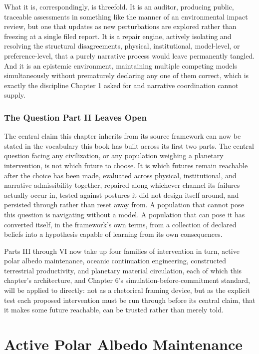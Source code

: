 \documentclass[11pt,oneside]{book}
\begin{document}
What it is, correspondingly, is threefold. It is an auditor, producing public, traceable assessments in something like the manner of an environmental impact review, but one that updates as new perturbations are explored rather than freezing at a single filed report. It is a repair engine, actively isolating and resolving the structural disagreements, physical, institutional, model-level, or preference-level, that a purely narrative process would leave permanently tangled. And it is an epistemic environment, maintaining multiple competing models simultaneously without prematurely declaring any one of them correct, which is exactly the discipline Chapter 1 asked for and narrative coordination cannot supply.

\section*{The Question Part II Leaves Open}

The central claim this chapter inherits from its source framework can now be stated in the vocabulary this book has built across its first two parts. The central question facing any civilization, or any population weighing a planetary intervention, is not which future to choose. It is which futures remain reachable after the choice has been made, evaluated across physical, institutional, and narrative admissibility together, repaired along whichever channel its failures actually occur in, tested against postures it did not design itself around, and persisted through rather than reset away from. A population that cannot pose this question is navigating without a model. A population that can pose it has converted itself, in the framework's own terms, from a collection of declared beliefs into a hypothesis capable of learning from its own consequences.

Parts III through VI now take up four families of intervention in turn, active polar albedo maintenance, oceanic continuation engineering, constructed terrestrial productivity, and planetary material circulation, each of which this chapter's architecture, and Chapter 6's simulation-before-commitment standard, will be applied to directly: not as a rhetorical framing device, but as the explicit test each proposed intervention must be run through before its central claim, that it makes some future reachable, can be trusted rather than merely told.

\part{Active Polar Albedo Maintenance}
\end{document}
